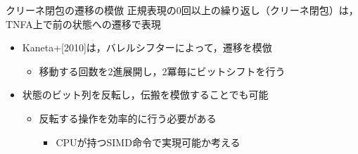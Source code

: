 \documentclass[dvipdfmx,12pt,notheorems]{beamer} %
\let\oldfootnotesize\footnotesize
\renewcommand*{\footnotesize}{\oldfootnotesize\tiny}
\begin{document}
\begin{frame}{クリーネ閉包の遷移の模倣}
		正規表現の$0$回以上の繰り返し（クリーネ閉包）は，\\TNFA上で前の状態への遷移で表現
			\begin{itemize}
				\item Kaneta+[2010]は，バレルシフターによって，遷移を模倣
					\begin{itemize}
						\item 移動する回数を2進展開し，2冪毎にビットシフトを行う
					\end{itemize}
				\item 状態のビット列を反転し，伝搬を模倣することでも可能
					\begin{itemize}
						\item 反転する操作を効率的に行う必要がある
							\begin{itemize}
								\item {\oldfootnotesize CPUが持つSIMD命令で実現可能か考える}
							\end{itemize}
					\end{itemize}
			\end{itemize}
\end{frame}
\end{document}
